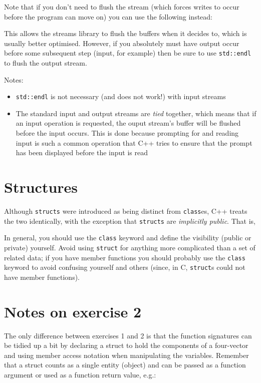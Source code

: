 \documentclass[a4paper]{scrartcl}
\begin{document}


Note that if you don't need to flush the stream (which forces writes to occur before the program can move on) you can use the following instead:



This allows the streams library to flush the buffers when it decides to, which is usually better optimised. However, if you absolutely must have output occur before some subsequent step (input, for example) then be sure to use \verb|std::endl| to flush the output stream.

Notes:
\begin{itemize}
	\item \verb|std::endl| is not necessary (and does not work!) with input streams

	\item The standard input and output streams are \emph{tied} together, which means that if an input operation is requested, the ouput stream's buffer will be flushed before the input occurs. This is done because prompting for and reading input is such a common operation that C++ tries to ensure that the prompt has been displayed before the input is read
\end{itemize}

\section{Structures}
Although \verb|structs| were introduced as being distinct from \verb|class|es, C++ treats the two identically, with the exception that \verb|structs| are \emph{implicitly public}. That is,



In general, you should use the \verb|class| keyword and define the visibility (public or private) yourself. Avoid using \verb|struct| for anything more complicated than a set of related data; if you have member functions you should probably use the \verb|class| keyword to avoid confusing yourself and others (since, in C, \verb|struct|s could not have member functions).

\section{Notes on exercise 2}
The only difference between exercises 1 and 2 is that the function signatures can be tidied up a bit by declaring a struct to hold the components of a four-vector and using member access notation when manipulating the variables. Remember that a struct counts as a single entity (object) and can be passed as a function argument or used as a function return value, e.g.:
\end{document}
